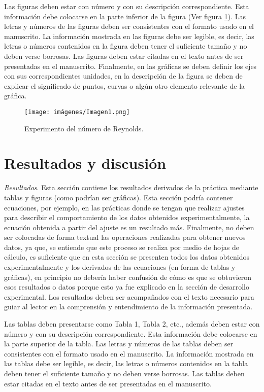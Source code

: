 \documentclass{replab}
\begin{document}
Las figuras deben estar con número y con su descripción correspondiente. Esta información debe colocarse en la parte inferior de la figura (Ver figura \ref{fig:numerouno}). Las letras y números de las figuras deben ser consistentes con el formato usado en el manuscrito. La información mostrada en las figuras debe ser legible, es decir, las letras o números contenidos en la figura deben tener el suficiente tamaño y no deben verse borrosas. Las figuras deben estar citadas en el texto antes de ser presentadas en el manuscrito. Finalmente, en las gráficas se deben definir los ejes con sus correspondientes unidades, en la descripción de la figura se deben de explicar el significado de puntos, curvas o algún otro elemento relevante de la gráfica.

\begin{figure}[hbt!]
    \centering
    \texttt{[image: imágenes/Imagen1.png]}
    \caption{Experimento del número de Reynolds.}
    \label{fig:numerouno}
\end{figure}

\section{Resultados y discusión}

\textit{Resultados}. Esta sección contiene los resultados derivados de la práctica mediante tablas y figuras (como podrían ser gráficas). Esta sección podría contener ecuaciones, por ejemplo, en las prácticas donde se tengan que realizar ajustes para describir el comportamiento de los datos obtenidos experimentalmente, la ecuación obtenida a partir del ajuste es un resultado más. Finalmente, no deben ser colocadas de forma textual las operaciones realizadas para obtener nuevos datos, ya que, se entiende que este proceso se realiza por medio de hojas de cálculo, es suficiente que en esta sección se presenten todos los datos obtenidos experimentalmente y los derivados de las ecuaciones (en forma de tablas y gráficas), en principio no debería haber confusión de cómo es que se obtuvieron esos resultados o datos porque esto ya fue explicado en la sección de desarrollo experimental. Los resultados deben ser acompañados con el texto necesario para guiar al lector en la comprensión y entendimiento de la información presentada.

Las tablas deben presentarse como Tabla 1, Tabla 2, etc., además deben estar con número y con su descripción correspondiente. Esta información debe colocarse en la parte superior de la tabla. Las letras y números de las tablas deben ser consistentes con el formato usado en el manuscrito. La información mostrada en las tablas debe ser legible, es decir, las letras o números contenidos en la tabla deben tener el suficiente tamaño y no deben verse borrosas. Las tablas deben estar citadas en el texto antes de ser presentadas en el manuscrito.
\end{document}

